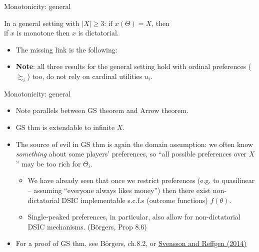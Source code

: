 \documentclass[english,10pt
,aspectratio=169
]{beamer}
\begin{document}
\begin{frame}{Monotonicity: general}
	\begin{theorem}
		In a general setting with $|X|\geq 3$: if $x(\Theta)=X$, then\\
		\centering
		if $x$ is monotone then $x$ is dictatorial.
	\end{theorem}
	\begin{itemize}
		\item The missing link is the following:
		\item \textbf{Note}: all three results for the general setting hold with ordinal preferences ($\succsim_i$) too, do not rely on cardinal utilities $u_i$.
	\end{itemize}
\end{frame}


\begin{frame}{Monotonicity: general}
	\begin{itemize}
		\item Note parallels between GS theorem and Arrow theorem.
		\item GS thm is extendable to infinite $X$.
		\item The source of evil in GS thm is again the domain assumption: we often know \emph{something} about some players' preferences, so ``all possible preferences over $X$'' may be too rich for $\Theta_i$.
		\begin{itemize}
			\item We have already seen that once we restrict preferences (e.g. to quasilinear -- assuming ``everyone always likes money'') then there exist non-dictatorial DSIC implementable s.c.f.s (outcome functions) $f(\theta)$.
			\item Single-peaked preferences, in particular, also allow for non-dictatorial DSIC mechanisms. (B{\"o}rgers, Prop 8.6)
		\end{itemize}
		\item For a proof of GS thm, see B{\"o}rgers, ch.8.2, or \href{http://dx.doi.org/10.1016/j.jmateco.2014.09.007}{\uline{Svensson and Reffgen (2014)}}
	\end{itemize}
\end{frame}
\end{document}
